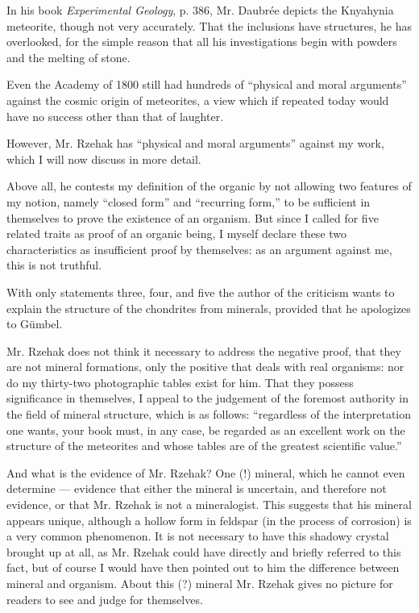 \documentclass[a4paper, 12pt, oneside]{article}
\begin{document}
In his book \emph{Experimental Geology}, p. 386, Mr. Daubrée depicts the Knyahynia meteorite, though not very accurately. That the inclusions have structures, he has overlooked, for the simple reason that all his investigations begin with powders and the melting of stone.

Even the Academy of 1800 still had hundreds of ``physical and moral arguments'' against the cosmic origin of meteorites, a view which if repeated today would have no success other than that of laughter.

However, Mr. Rzehak has ``physical and moral arguments'' against my work, which I will now discuss in more detail.

Above all, he contests my definition of the organic by not allowing two features of my notion, namely ``closed form'' and ``recurring form,'' to be sufficient in themselves to prove the existence of an organism. But since I called for five related traits as proof of an organic being, I myself declare these two characteristics as insufficient proof by themselves: as an argument against me, this is not truthful.

With only statements three, four, and five the author of the criticism wants to explain the structure of the chondrites from minerals, provided that he apologizes to Gümbel.

Mr. Rzehak does not think it necessary to address the negative proof, that they are not mineral formations, only the positive that deals with real organisms: nor do my thirty-two photographic tables exist for him. That they possess significance in themselves, I appeal to the judgement of the foremost authority in the field of mineral structure, which is as follows: ``regardless of the interpretation one wants, your book must, in any case, be regarded as an excellent work on the structure of the meteorites and whose tables are of the greatest scientific value.''

And what is the evidence of Mr. Rzehak? One (!) mineral, which he cannot even determine --- evidence that either the mineral is uncertain, and therefore not evidence, or that Mr. Rzehak is not a mineralogist. This suggests that his mineral appears unique, although a hollow form in feldspar (in the process of corrosion) is a very common phenomenon. It is not necessary to have this shadowy crystal brought up at all, as Mr. Rzehak could have directly and briefly referred to this fact, but of course I would have then pointed out to him the difference between mineral and organism. About this (?) mineral Mr. Rzehak gives no picture for readers to see and judge for themselves.
\end{document}
